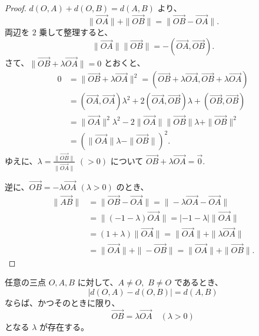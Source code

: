 \begin{proof}
  \(d(O,A)+d(O,B)=d(A,B)\) より、
  \[\|\overrightarrow{OA}\|+\|\overrightarrow{OB}\|=\|\overrightarrow{OB}-\overrightarrow{OA}\|.\]
  両辺を \(2\) 乗して整理すると、
  \[\|\overrightarrow{OA}\|\|\overrightarrow{OB}\|=-(\overrightarrow{OA},\overrightarrow{OB}).\]
  さて、\(\|\overrightarrow{OB}+\lambda\overrightarrow{OA}\|=0\) とおくと、
  \begin{align*}
    0 &= \|\overrightarrow{OB}+\lambda\overrightarrow{OA}\|^2=(\overrightarrow{OB}+\lambda{\overrightarrow{OA}},\overrightarrow{OB}+\lambda\overrightarrow{OA}) \\
      &= (\overrightarrow{OA},\overrightarrow{OA})\lambda^2+2(\overrightarrow{OA},\overrightarrow{OB})\lambda+(\overrightarrow{OB},\overrightarrow{OB}) \\
      &= \|\overrightarrow{OA}\|^2\lambda^2-2\|\overrightarrow{OA}\|\|\overrightarrow{OB}\|\lambda+\|\overrightarrow{OB}\|^2 \\
      &= (\|\overrightarrow{OA}\|\lambda-\|\overrightarrow{OB}\|)^2.
  \end{align*}
  ゆえに、\(\displaystyle \lambda=\frac{\|\overrightarrow{OB}\|}{\|\overrightarrow{OA}\|}\) \((>0)\) について \(\overrightarrow{OB}+\lambda\overrightarrow{OA}=\vec{0}.\)

  逆に、\(\overrightarrow{OB}=-\lambda\overrightarrow{OA}\) \((\lambda>0)\) のとき、
  \begin{align*}
    \|\overrightarrow{AB}\| &= \|\overrightarrow{OB}-\overrightarrow{OA}\|=\|-\lambda\overrightarrow{OA}-\overrightarrow{OA}\| \\
                            &= \|(-1-\lambda)\overrightarrow{OA}\|=|-1-\lambda|\|\overrightarrow{OA}\| \\
                            &= (1+\lambda)\|\overrightarrow{OA}\|=\|\overrightarrow{OA}\|+\|\lambda\overrightarrow{OA}\| \\
                            &= \|\overrightarrow{OA}\|+\|-\overrightarrow{OB}\|=\|\overrightarrow{OA}\|+\|\overrightarrow{OB}\|.
  \end{align*}
\end{proof}

\begin{thm}\label{251101145402}
  任意の三点 \(O,A,B\) に対して、\(A\neq O,\) \(B\neq O\) であるとき、
  \[|d(O,A)-d(O,B)|=d(A,B)\]
  ならば、かつそのときに限り、
  \[\overrightarrow{OB}=\lambda\overrightarrow{OA} \quad (\lambda>0)\]
  となる \(\lambda\) が存在する。
\end{thm}


